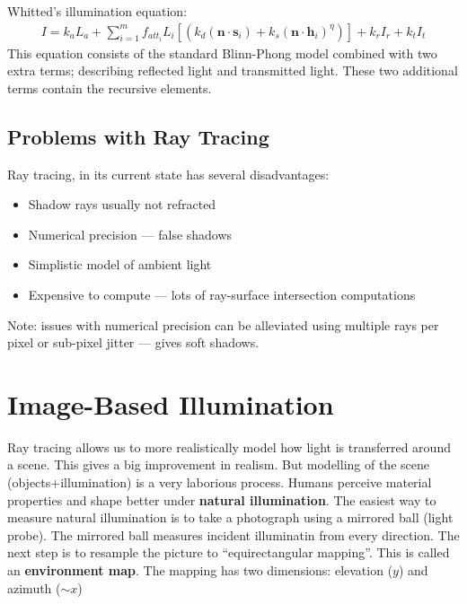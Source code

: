 \documentclass{article}
\begin{document}
Whitted's illumination equation:
\begin{align*}
	I = k_aL_a + \sum^m_{i=1}f_{att_i}L_i[(k_d(\textbf{n}\cdot\textbf{s}_i)+k_s(\textbf{n}\cdot\textbf{h}_i)^{\eta})] + k_rI_r + k_tI_t
\end{align*}
This equation consists of the standard Blinn-Phong model combined with two extra terms; describing reflected light and transmitted light.
These two additional terms contain the recursive elements.


\subsection{Problems with Ray Tracing}
Ray tracing, in its current state has several disadvantages:
\begin{itemize}
	\item Shadow rays usually not refracted
	\item Numerical precision --- false shadows
	\item Simplistic model of ambient light
	\item Expensive to compute --- lots of ray-surface intersection computations
\end{itemize}
Note: issues with numerical precision can be alleviated using multiple rays per pixel or sub-pixel jitter --- gives soft shadows.

\section{Image-Based Illumination}
Ray tracing allows us to more realistically model how light is transferred around a scene.
This gives a big improvement in realism.
But modelling of the scene (objects+illumination) is a very laborious process.
Humans perceive material properties and shape better under \textbf{natural illumination}.
The easiest way to measure natural illumination is to take a photograph using a mirrored ball (light probe).
The mirrored ball measures incident illuminatin from every direction.
The next step is to resample the picture to ``equirectangular mapping''.
This is called an \textbf{environment map}.
The mapping has two dimensions: elevation ($y$) and azimuth ($\sim x$)
\end{document}
